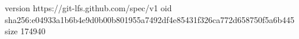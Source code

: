 version https://git-lfs.github.com/spec/v1
oid sha256:e04933a1b6b4e9d0b00b801955a7492df4e85431f326ca772d658750f5a6b445
size 174940
